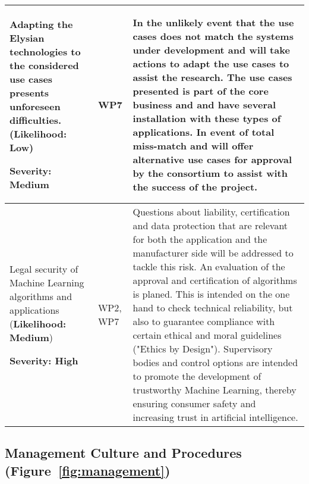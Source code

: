 \documentclass[a4paper,11pt]{article}
\newcommand{\project}[1]{\textbf{#1}\xspace}
\newcommand{\SECURITY}{\project{Elysian}}
\newcommand{\TheProject}{\SECURITY}
\begin{document}
\begin{longtable}{| p{3.5cm} | p{1.5cm} | p{11.8cm}  |}
\\\hline
Adapting the \TheProject{} technologies to the considered use cases presents unforeseen difficulties.
(\textbf{Likelihood: Low})
\par
{\textbf{Severity: Medium}}
& WP7 &

In the unlikely event that the use cases does not match the systems under development \SOPRAshort{} and \FRQshort{} will take actions to adapt the use cases to assist the research. The use cases presented is part of the core business and \SOPRAshort{} and \FRQshort{} have several installation with these types of applications. In event of total miss-match \SOPRAshort{} and \FRQshort{ }will offer alternative use cases for approval by the consortium to assist with the success of the project.

\\\hline
Legal security of Machine Learning algorithms and applications 
(\textbf{Likelihood: Medium})
\par
{\textbf{Severity: High}}
& WP2, WP7 &

Questions about liability, certification and data protection that are relevant for both the application and the manufacturer side will be addressed to tackle this risk. An evaluation of the approval and certification of algorithms is planed. This is intended on the one hand to check technical reliability, but also to guarantee compliance with certain ethical and moral guidelines ("Ethics by Design"). Supervisory bodies and control options are intended to promote the development of trustworthy Machine Learning, thereby ensuring consumer safety and increasing trust in artificial intelligence.

\\\hline

\end{longtable}

\subsection{Management Culture and Procedures (Figure~\ref{fig:management})}
\label{sect:mgt}

\end{document}
